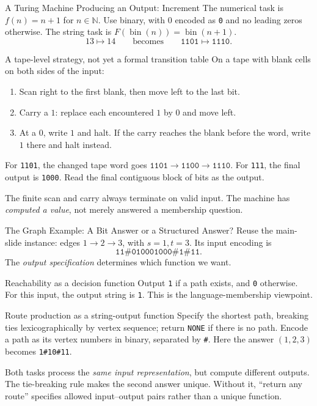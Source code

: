 \documentclass[10pt]{beamer}
\begin{document}
\begin{frame}{A Turing Machine Producing an Output: Increment}
  \small
  The numerical task is $f(n)=n+1$ for $n\in\mathbb{N}$.
  Use binary, with $0$ encoded as \texttt{0} and no leading zeros otherwise.
  The string task is $F(\operatorname{bin}(n))=\operatorname{bin}(n+1)$.
  \[
    13\mapsto14\qquad\text{becomes}\qquad
    \texttt{1101}\mapsto\texttt{1110}.
  \]
  \pause
  \begin{block}{A tape-level strategy, not yet a formal transition table}
    On a tape with blank cells on both sides of the input:
    \begin{enumerate}
      \item Scan right to the first blank, then move left to the last bit.
      \item Carry a $1$: replace each encountered $1$ by $0$ and move left.
      \item At a $0$, write $1$ and halt. If the carry reaches the blank
        before the word, write $1$ there and halt instead.
    \end{enumerate}
  \end{block}
  \pause
  For \texttt{1101}, the changed tape word goes
  $\texttt{1101}\to\texttt{1100}\to\texttt{1110}$.
  For \texttt{111}, the final output is \texttt{1000}.
  Read the final contiguous block of bits as the output.
  \par\smallskip
  The finite scan and carry always terminate on valid input. The machine
  has \emph{computed a value}, not merely answered a membership question.
\end{frame}

\begin{frame}{The Graph Example: A Bit Answer or a Structured Answer?}
  \small
  Reuse the main-slide instance: edges $1\to2\to3$, with $s=1,t=3$.
  Its input encoding is
  \[
    \texttt{11\#010001000\#1\#11}.
  \]
  The \emph{output specification} determines which function we want.
  \begin{block}{Reachability as a decision function}
    Output \texttt{1} if a path exists, and \texttt{0} otherwise.
    For this input, the output string is \texttt{1}.
    This is the language-membership viewpoint.
  \end{block}
  \pause
  \begin{block}{Route production as a string-output function}
    Specify the shortest path, breaking ties lexicographically by vertex
    sequence; return \texttt{NONE} if there is no path.
    Encode a path as its vertex numbers in binary, separated by \texttt{\#}.
    Here the answer $(1,2,3)$ becomes \texttt{1\#10\#11}.
  \end{block}
  \pause
  Both tasks process the \emph{same input representation}, but compute
  different outputs. The tie-breaking rule makes the second answer unique.
  Without it, ``return any route'' specifies allowed input--output pairs
  rather than a unique function.
\end{frame}
\end{document}
